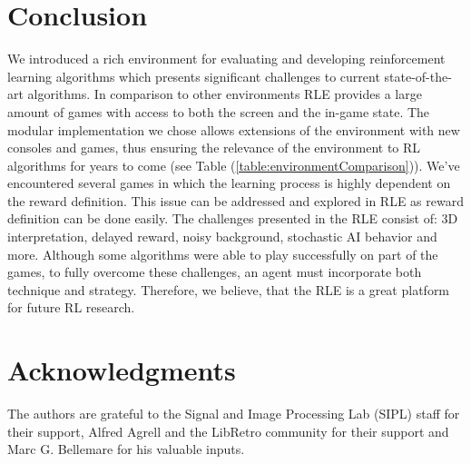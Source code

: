 \documentclass{article}
\begin{document}
\section{Conclusion}
We introduced a rich environment for evaluating and developing reinforcement learning algorithms which presents significant challenges to current state-of-the-art algorithms. 
In comparison to other environments RLE provides a large amount of games with access to both the screen and the in-game state.
The modular implementation we chose allows extensions of the environment with new consoles and games, thus ensuring the relevance of the environment to RL algorithms for years to come (see Table (\ref{table:environmentComparison})).
We've encountered several games in which the learning process is highly dependent on the reward definition. 
This issue can be addressed and explored in RLE as reward definition can be done easily.
The challenges presented in the RLE consist of: 3D interpretation, delayed reward, noisy background, stochastic AI behavior and more. 
Although some algorithms were able to play successfully on part of the games, to fully overcome these challenges, an agent must incorporate both technique and strategy. Therefore, we believe, that the RLE is a great platform for future RL research. 

\section{Acknowledgments}
The authors are grateful to the Signal and Image Processing Lab (SIPL) staff for their support, Alfred Agrell and the LibRetro community for their support and Marc G. Bellemare for his valuable inputs.



\newpage
\end{document}
